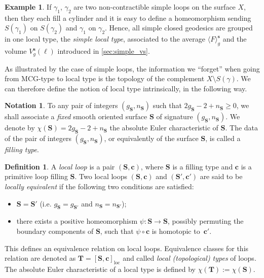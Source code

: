 \documentclass[12pt,twoside]{article}
\theoremstyle{theorem}
\theoremstyle{remark}
\theoremstyle{definition}
\newtheorem{defi}[thm]{Definition}
\newtheorem{nota}[thm]{Notation}
\theoremstyle{example}
\newtheorem{expl}[thm]{Example}
\newcommand{\1}[1]{\mathds{1}_{#1}}
\newcommand{\MCG}{\mathrm{MCG}}
\newcommand{\Sf}{\mathbf{S}}
\newcommand{\eqc}[1]{[ #1 ]_{\mathrm{loc}}}
\newcommand{\curve}{\mathbf{c}}
\newcommand{\type}{\mathbf{T}}
\newcommand{\av}[2][\mathrm{all}]{\langle #2 \rangle_g^{{#1}}}
\begin{document}
\begin{expl}
  If $\gamma_1$, $\gamma_2$ are two non-contractible simple loops on the surface $X$, then they each
  fill a cylinder and it is easy to define a homeomorphism sending $S(\gamma_1)$ on $S(\gamma_2)$
  and $\gamma_1$ on $\gamma_2$. Hence, all simple closed geodesics are grouped in one local type,
  the \emph{simple local type}, associated to the average $\av[\mathbf{s}]{F}$ and the volume
  $V_g^{\mathbf{s}}(\ell)$ introduced in \cref{sec:simple_vs}.
\end{expl}

As illustrated by the case of simple loops, the information we ``forget'' when going from
$\MCG$-type to local type is the topology of the complement $X \setminus S(\gamma)$.  We can
therefore define the notion of local type intrinsically, in the following way.

  \begin{nota}\label{n:FT}
    To any pair of integers $(g_\Sf, n_\Sf)$ such that $ 2g_\Sf-2+n_\Sf \geq 0$, we shall associate a
    \emph{fixed} smooth oriented surface $\Sf$ of signature $(g_\Sf,n_\Sf)$. We denote by
    $\chi(\Sf)= 2g_\Sf-2+n_\Sf$ the absolute Euler characteristic of $\Sf$.  The data of the pair of
    integers $(g_\Sf, n_\Sf)$, or equivalently of the surface $\Sf$, is called a \emph{filling type}.
  \end{nota}

  
  \begin{defi}
  \label{def:local_type}
  A \emph{local loop} is a pair $(\Sf,\curve)$, where $\Sf$ is a filling type and $\curve$ is a
  primitive loop filling $\Sf$. Two local loops $(\Sf,\curve)$ and $(\Sf',\curve')$ are said to be
  \emph{locally equivalent} if the following two conditions are satisfied:
  \begin{itemize}
  \item $\Sf=\Sf'$ (i.e.  $g_\Sf = g_{\Sf'}$ and $n_\Sf=n_{\Sf'}$);
  \item there exists a positive homeomorphism $\psi : \Sf \rightarrow \Sf$, possibly
    permuting the boundary components of $\Sf$, such that $\psi \circ \curve$ is homotopic to~$\curve'$.
  \end{itemize}
This defines an equivalence relation on local loops. Equivalence classes for this relation are
denoted as $\type=\eqc{\Sf, \curve}$ and called \emph{local (topological) types} of loops. The absolute
Euler characteristic of a local type is defined by $\chi(\type):=\chi(\Sf)$.
\end{defi}
\end{document}
